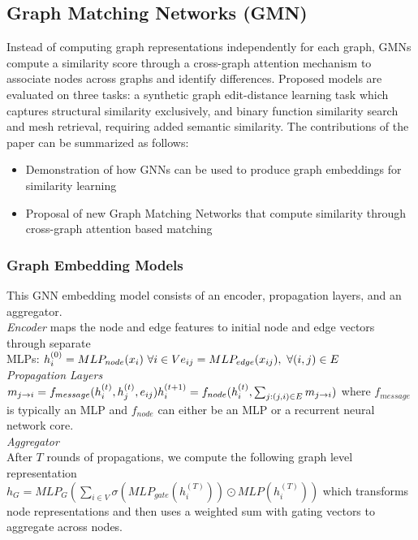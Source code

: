 \documentclass{article}
\begin{document}
\subsection{Graph Matching Networks (GMN)}
Instead of computing graph representations independently for each graph, GMNs compute a similarity score through a cross-graph attention mechanism to associate nodes across graphs and identify differences.
Proposed models are evaluated on three tasks: a synthetic graph edit-distance learning task which captures structural similarity exclusively, and binary function similarity search and mesh retrieval, requiring added semantic similarity.
The contributions of the paper can be summarized as follows:
\begin{itemize}
    \item Demonstration of how GNNs can be used to produce graph embeddings for similarity learning
    \item Proposal of new Graph Matching Networks that compute similarity through cross-graph attention based matching
\end{itemize}
\subsubsection{Graph Embedding Models}
This GNN embedding model consists of an encoder, propagation layers, and an aggregator.\\
\textit{Encoder} maps the node and edge features to initial node and edge vectors through separate\\ MLPs:
$h_i^{(0)} = MLP_{node}(x_i) \  \forall i \in V \\
e_{ij} = MLP_{edge}(x_{ij}), \ \forall (i,j) \in E$\\
\textit{Propagation Layers}\\
$ m_{j \rightarrow i} = f_{message}(h_i^{(t)}, h_j^{(t)}, e_{ij})\\
h_i^{(t+1)} = f_{node}(h_i^{(t)}, \sum_{j:(j,i) \in E} m_{j \rightarrow i})
$ where $f_{message}$ is typically an MLP and $f_{node}$ can either be an MLP or a recurrent neural network core.\\
\textit{Aggregator}\\
After $T$ rounds of propagations, we compute the following graph level representation\\
$h_G = MLP_G(\sum\limits_{i \in V}\sigma(MLP_{gate}(h_i^{(T)}))\odot MLP(h_i^{(T)}))$ which transforms node representations and then uses a weighted sum with gating vectors to aggregate across nodes.
\end{document}
